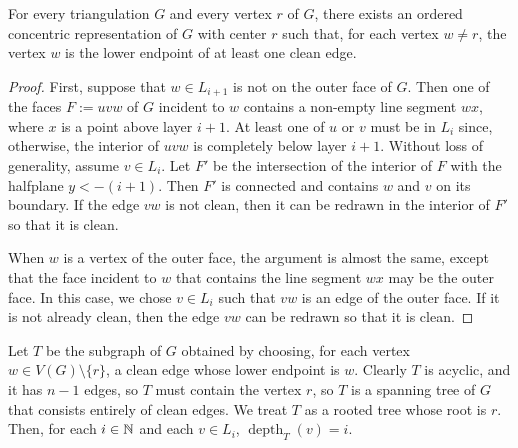 \documentclass{patmorin}
\DeclareMathOperator{\depth}{depth}
\DeclareMathOperator{\pth}{path}
\begin{document}
\begin{lem}\label{clean_edge}
  For every triangulation $G$ and every vertex $r$ of $G$, there exists an ordered concentric representation of $G$ with center $r$ such that, for each vertex $w\neq r$, the vertex $w$ is the lower endpoint of at least one clean edge.
\end{lem}

\begin{proof}
  First, suppose that $w\in L_{i+1}$ is not on the outer face of $G$.  Then one of the faces $F:=uvw$ of $G$ incident to $w$ contains a non-empty line segment $wx$, where $x$ is a point above layer $i+1$. At least one of $u$ or $v$ must be in $L_{i}$ since, otherwise, the interior of $uvw$ is completely below layer $i+1$. Without loss of generality, assume $v\in L_i$. Let $F'$ be the intersection of the interior of $F$ with the halfplane $y<-(i+1)$. Then $F'$ is connected and contains $w$ and $v$ on its boundary.  If the edge $vw$ is not clean, then it can be redrawn in the interior of $F'$ so that it is clean.

  When $w$ is a vertex of the outer face, the argument is almost the same, except that the face incident to $w$ that contains the line segment $wx$ may be the outer face.  In this case, we chose $v\in L_i$ such that $vw$ is an edge of the outer face. If it is not already clean, then the edge $vw$ can be redrawn so that it is clean.
\end{proof}

Let $T$ be the subgraph of $G$ obtained by choosing, for each vertex $w\in V(G)\setminus\{r\}$, a clean edge whose lower endpoint is $w$.  Clearly $T$ is acyclic, and it has $n-1$ edges, so $T$ must contain the vertex $r$, so $T$ is a spanning tree of $G$ that consists entirely of clean edges.  We treat $T$ as a rooted tree whose root is $r$.  Then, for each $i\in\mathbb{N}$ and each $v\in L_i$, $\depth_T(v)=i$.

\end{document}
